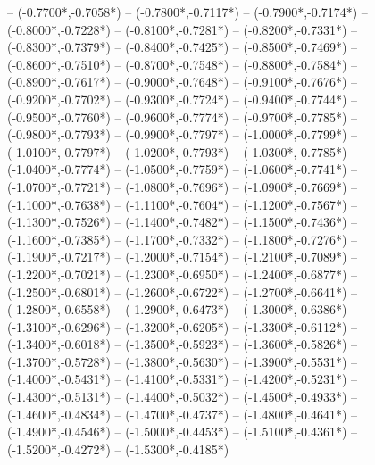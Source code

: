 {	-- ({-0.7700*\dx},{-0.7058*\dy})
	-- ({-0.7800*\dx},{-0.7117*\dy})
	-- ({-0.7900*\dx},{-0.7174*\dy})
	-- ({-0.8000*\dx},{-0.7228*\dy})
	-- ({-0.8100*\dx},{-0.7281*\dy})
	-- ({-0.8200*\dx},{-0.7331*\dy})
	-- ({-0.8300*\dx},{-0.7379*\dy})
	-- ({-0.8400*\dx},{-0.7425*\dy})
	-- ({-0.8500*\dx},{-0.7469*\dy})
	-- ({-0.8600*\dx},{-0.7510*\dy})
	-- ({-0.8700*\dx},{-0.7548*\dy})
	-- ({-0.8800*\dx},{-0.7584*\dy})
	-- ({-0.8900*\dx},{-0.7617*\dy})
	-- ({-0.9000*\dx},{-0.7648*\dy})
	-- ({-0.9100*\dx},{-0.7676*\dy})
	-- ({-0.9200*\dx},{-0.7702*\dy})
	-- ({-0.9300*\dx},{-0.7724*\dy})
	-- ({-0.9400*\dx},{-0.7744*\dy})
	-- ({-0.9500*\dx},{-0.7760*\dy})
	-- ({-0.9600*\dx},{-0.7774*\dy})
	-- ({-0.9700*\dx},{-0.7785*\dy})
	-- ({-0.9800*\dx},{-0.7793*\dy})
	-- ({-0.9900*\dx},{-0.7797*\dy})
	-- ({-1.0000*\dx},{-0.7799*\dy})
	-- ({-1.0100*\dx},{-0.7797*\dy})
	-- ({-1.0200*\dx},{-0.7793*\dy})
	-- ({-1.0300*\dx},{-0.7785*\dy})
	-- ({-1.0400*\dx},{-0.7774*\dy})
	-- ({-1.0500*\dx},{-0.7759*\dy})
	-- ({-1.0600*\dx},{-0.7741*\dy})
	-- ({-1.0700*\dx},{-0.7721*\dy})
	-- ({-1.0800*\dx},{-0.7696*\dy})
	-- ({-1.0900*\dx},{-0.7669*\dy})
	-- ({-1.1000*\dx},{-0.7638*\dy})
	-- ({-1.1100*\dx},{-0.7604*\dy})
	-- ({-1.1200*\dx},{-0.7567*\dy})
	-- ({-1.1300*\dx},{-0.7526*\dy})
	-- ({-1.1400*\dx},{-0.7482*\dy})
	-- ({-1.1500*\dx},{-0.7436*\dy})
	-- ({-1.1600*\dx},{-0.7385*\dy})
	-- ({-1.1700*\dx},{-0.7332*\dy})
	-- ({-1.1800*\dx},{-0.7276*\dy})
	-- ({-1.1900*\dx},{-0.7217*\dy})
	-- ({-1.2000*\dx},{-0.7154*\dy})
	-- ({-1.2100*\dx},{-0.7089*\dy})
	-- ({-1.2200*\dx},{-0.7021*\dy})
	-- ({-1.2300*\dx},{-0.6950*\dy})
	-- ({-1.2400*\dx},{-0.6877*\dy})
	-- ({-1.2500*\dx},{-0.6801*\dy})
	-- ({-1.2600*\dx},{-0.6722*\dy})
	-- ({-1.2700*\dx},{-0.6641*\dy})
	-- ({-1.2800*\dx},{-0.6558*\dy})
	-- ({-1.2900*\dx},{-0.6473*\dy})
	-- ({-1.3000*\dx},{-0.6386*\dy})
	-- ({-1.3100*\dx},{-0.6296*\dy})
	-- ({-1.3200*\dx},{-0.6205*\dy})
	-- ({-1.3300*\dx},{-0.6112*\dy})
	-- ({-1.3400*\dx},{-0.6018*\dy})
	-- ({-1.3500*\dx},{-0.5923*\dy})
	-- ({-1.3600*\dx},{-0.5826*\dy})
	-- ({-1.3700*\dx},{-0.5728*\dy})
	-- ({-1.3800*\dx},{-0.5630*\dy})
	-- ({-1.3900*\dx},{-0.5531*\dy})
	-- ({-1.4000*\dx},{-0.5431*\dy})
	-- ({-1.4100*\dx},{-0.5331*\dy})
	-- ({-1.4200*\dx},{-0.5231*\dy})
	-- ({-1.4300*\dx},{-0.5131*\dy})
	-- ({-1.4400*\dx},{-0.5032*\dy})
	-- ({-1.4500*\dx},{-0.4933*\dy})
	-- ({-1.4600*\dx},{-0.4834*\dy})
	-- ({-1.4700*\dx},{-0.4737*\dy})
	-- ({-1.4800*\dx},{-0.4641*\dy})
	-- ({-1.4900*\dx},{-0.4546*\dy})
	-- ({-1.5000*\dx},{-0.4453*\dy})
	-- ({-1.5100*\dx},{-0.4361*\dy})
	-- ({-1.5200*\dx},{-0.4272*\dy})
	-- ({-1.5300*\dx},{-0.4185*\dy})
}
